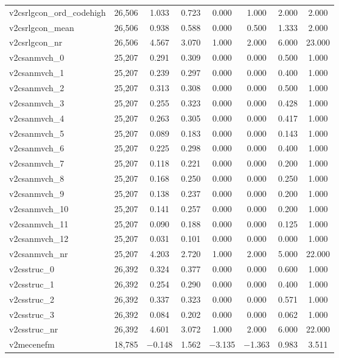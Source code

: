 \begin{table}[!htbp]
\begin{tabular}{@{\extracolsep{5pt}}lccccccc}
v2csrlgcon\_ord\_codehigh & 26,506 & 1.033 & 0.723 & 0.000 & 1.000 & 2.000 & 2.000 \\ 
v2csrlgcon\_mean & 26,506 & 0.938 & 0.588 & 0.000 & 0.500 & 1.333 & 2.000 \\ 
v2csrlgcon\_nr & 26,506 & 4.567 & 3.070 & 1.000 & 2.000 & 6.000 & 23.000 \\ 
v2csanmvch\_0 & 25,207 & 0.291 & 0.309 & 0.000 & 0.000 & 0.500 & 1.000 \\ 
v2csanmvch\_1 & 25,207 & 0.239 & 0.297 & 0.000 & 0.000 & 0.400 & 1.000 \\ 
v2csanmvch\_2 & 25,207 & 0.313 & 0.308 & 0.000 & 0.000 & 0.500 & 1.000 \\ 
v2csanmvch\_3 & 25,207 & 0.255 & 0.323 & 0.000 & 0.000 & 0.428 & 1.000 \\ 
v2csanmvch\_4 & 25,207 & 0.263 & 0.305 & 0.000 & 0.000 & 0.417 & 1.000 \\ 
v2csanmvch\_5 & 25,207 & 0.089 & 0.183 & 0.000 & 0.000 & 0.143 & 1.000 \\ 
v2csanmvch\_6 & 25,207 & 0.225 & 0.298 & 0.000 & 0.000 & 0.400 & 1.000 \\ 
v2csanmvch\_7 & 25,207 & 0.118 & 0.221 & 0.000 & 0.000 & 0.200 & 1.000 \\ 
v2csanmvch\_8 & 25,207 & 0.168 & 0.250 & 0.000 & 0.000 & 0.250 & 1.000 \\ 
v2csanmvch\_9 & 25,207 & 0.138 & 0.237 & 0.000 & 0.000 & 0.200 & 1.000 \\ 
v2csanmvch\_10 & 25,207 & 0.141 & 0.257 & 0.000 & 0.000 & 0.200 & 1.000 \\ 
v2csanmvch\_11 & 25,207 & 0.090 & 0.188 & 0.000 & 0.000 & 0.125 & 1.000 \\ 
v2csanmvch\_12 & 25,207 & 0.031 & 0.101 & 0.000 & 0.000 & 0.000 & 1.000 \\ 
v2csanmvch\_nr & 25,207 & 4.203 & 2.720 & 1.000 & 2.000 & 5.000 & 22.000 \\ 
v2csstruc\_0 & 26,392 & 0.324 & 0.377 & 0.000 & 0.000 & 0.600 & 1.000 \\ 
v2csstruc\_1 & 26,392 & 0.254 & 0.290 & 0.000 & 0.000 & 0.400 & 1.000 \\ 
v2csstruc\_2 & 26,392 & 0.337 & 0.323 & 0.000 & 0.000 & 0.571 & 1.000 \\ 
v2csstruc\_3 & 26,392 & 0.084 & 0.202 & 0.000 & 0.000 & 0.062 & 1.000 \\ 
v2csstruc\_nr & 26,392 & 4.601 & 3.072 & 1.000 & 2.000 & 6.000 & 22.000 \\ 
v2mecenefm & 18,785 & $-$0.148 & 1.562 & $-$3.135 & $-$1.363 & 0.983 & 3.511 \\ 

\end{tabular}
\end{table}
